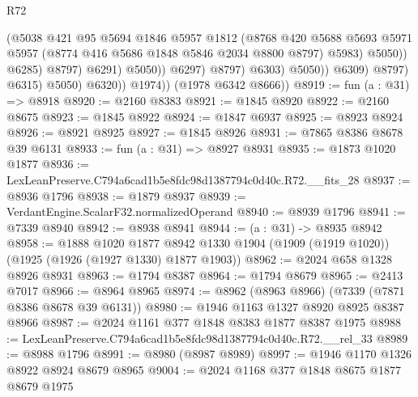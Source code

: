 \begin{lexlean}{R72}
\begin{coremodule}
                                            (@5038
                                              @421
                                              @95
                                              @5694
                                              @1846
                                              @5957
                                              @1812
                                              (@8768
                                                @420
                                                @5688
                                                @5693
                                                @5971
                                                @5957
                                                (@8774 @416 @5686 @1848 @5846 @2034 @8800 @8797)
                                                @5983)
                                              @5050))
                                          @6285)
                                        @8797)
                                      @6291)
                                    @5050))
                                @6297)
                              @8797)
                            @6303)
                          @5050))
                      @6309)
                    @8797)
                  @6315)
                @5050)
              @6320))
          @1974))
      (@1978 @6342 @8666))
@8919 := fun (a : @31) => @8918
@8920 := @2160 @8383
@8921 := @1845 @8920
@8922 := @2160 @8675
@8923 := @1845 @8922
@8924 := @1847 @6937
@8925 := @8923 @8924
@8926 := @8921 @8925
@8927 := @1845 @8926
@8931 := @7865 @8386 @8678 @39 @6131
@8933 := fun (a : @31) => @8927 @8931
@8935 := @1873 @1020 @1877
@8936 := LexLeanPreserve.C794a6cad1b5e8fdc98d1387794c0d40c.R72.__fits_28
@8937 := @8936 @1796
@8938 := @1879 @8937
@8939 := VerdantEngine.ScalarF32.normalizedOperand
@8940 := @8939 @1796
@8941 := @7339 @8940
@8942 := @8938 @8941
@8944 := (a : @31) -> @8935 @8942
@8958 := @1888
    @1020
    @1877
    @8942
    @1330
    @1904
    (@1909 (@1919 @1020))
    (@1925 (@1926 (@1927 @1330) @1877 @1903))
@8962 := @2024 @658 @1328 @8926 @8931
@8963 := @1794 @8387
@8964 := @1794 @8679
@8965 := @2413 @7017
@8966 := @8964 @8965
@8974 := @8962 (@8963 @8966) (@7339 (@7871 @8386 @8678 @39 @6131))
@8980 := @1946 @1163 @1327 @8920 @8925 @8387 @8966
@8987 := @2024 @1161 @377 @1848 @8383 @1877 @8387 @1975
@8988 := LexLeanPreserve.C794a6cad1b5e8fdc98d1387794c0d40c.R72.__rel_33
@8989 := @8988 @1796
@8991 := @8980 (@8987 @8989)
@8997 := @1946 @1170 @1326 @8922 @8924 @8679 @8965
@9004 := @2024 @1168 @377 @1848 @8675 @1877 @8679 @1975

\end{coremodule}
\end{lexlean}
